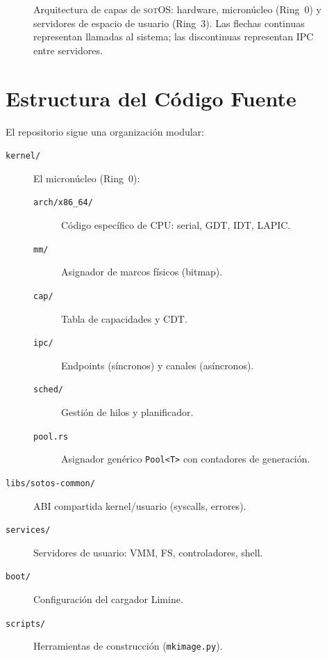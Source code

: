 \documentclass[11pt,twoside,openright]{book}
\theoremstyle{definition}
\theoremstyle{plain}
\theoremstyle{remark}
\newcommand{\sotos}{\textsc{sotOS}}
\begin{document}
\begin{figure}[ht]
\caption{Arquitectura de capas de \sotos{}: hardware, micronúcleo (Ring~0) y
servidores de espacio de usuario (Ring~3). Las flechas continuas representan
llamadas al sistema; las discontinuas representan IPC entre servidores.}
\label{fig:architecture}
\end{figure}

\section{Estructura del Código Fuente}

El repositorio sigue una organización modular:

\begin{description}
    \item[\texttt{kernel/}] El micronúcleo (Ring~0):
    \begin{description}
        \item[\texttt{arch/x86\_64/}] Código específico de CPU: serial, GDT, IDT, LAPIC.
        \item[\texttt{mm/}] Asignador de marcos físicos (bitmap).
        \item[\texttt{cap/}] Tabla de capacidades y CDT.
        \item[\texttt{ipc/}] Endpoints (síncronos) y canales (asíncronos).
        \item[\texttt{sched/}] Gestión de hilos y planificador.
        \item[\texttt{pool.rs}] Asignador genérico \texttt{Pool<T>} con contadores de generación.
    \end{description}
    \item[\texttt{libs/sotos-common/}] ABI compartida kernel/usuario (syscalls, errores).
    \item[\texttt{services/}] Servidores de usuario: VMM, FS, controladores, shell.
    \item[\texttt{boot/}] Configuración del cargador Limine.
    \item[\texttt{scripts/}] Herramientas de construcción (\texttt{mkimage.py}).
\end{description}
\end{document}
